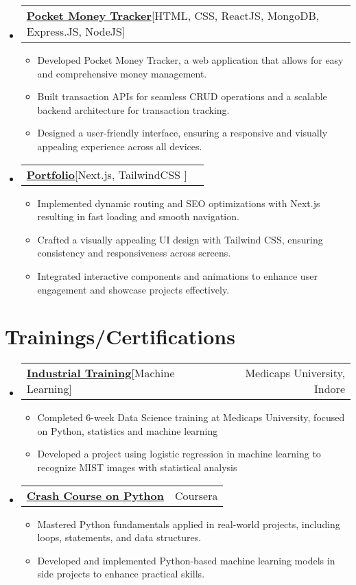 \documentclass[letterpaper,10pt]{article}
\makeatletter
\newcommand{\resumeItem}[1]{
    \item\small{
      {#1 \vspace{-2pt}}
    }
  }
\newcommand{\resumeCertheading}[2]{
    \vspace{5pt}\item
      \begin{tabular*}{0.97\textwidth}[t]{l@{\extracolsep{\fill}}r}
        {#1} & #2 \\
      \end{tabular*}\vspace{-7pt}
  }
\newcommand{\resumeSubSubheading}[2]{
      \item
      \begin{tabular*}{0.97\textwidth}{l@{\extracolsep{\fill}}r}
        \textit{\small#1} & \textit{\small #2} \\
      \end{tabular*}\vspace{-7pt}
  }
\newcommand{\resumeProjectHeading}[2]{
      \item
      \begin{tabular*}{0.97\textwidth}{l@{\extracolsep{\fill}}r}
        \small#1 & #2 \\
      \end{tabular*}\vspace{-7pt}
  }
\newcommand{\resumeSubHeadingListStart}{\begin{itemize}[leftmargin=0.15in, label={}]}
\newcommand{\resumeSubHeadingListEnd}{\end{itemize}}
\newcommand{\resumeItemListStart}{\begin{itemize}}
\newcommand{\resumeItemListEnd}{\end{itemize}\vspace{-5pt}}
\makeatother
\begin{document}
\resumeSubHeadingListStart
\resumeProjectHeading
{\textbf{\href{https://github.com/shanutiwari1010/money-tracker-app}{Pocket Money Tracker}\hspace{5pt}}{[HTML, CSS, ReactJS, MongoDB, Express.JS, NodeJS]}}{}
\resumeItemListStart
\resumeItem{Developed Pocket Money Tracker, a web application that allows for easy and comprehensive money management.}
\resumeItem{Built transaction APIs for seamless CRUD operations and a scalable backend architecture for transaction tracking.}
\resumeItem{Designed a user-friendly interface, ensuring a responsive and visually appealing experience across all devices.}
\resumeItemListEnd
\resumeSubHeadingListEnd


\resumeSubHeadingListStart
\resumeProjectHeading
{\textbf{\href{https://github.com/shanutiwari1010/portfolio}{Portfolio}\hspace{5pt}}{{[Next.js, TailwindCSS ]}}}{}
\resumeItemListStart
\resumeItem{Implemented dynamic routing and SEO optimizations with Next.js resulting in fast loading and smooth navigation.}
\resumeItem{Crafted a visually appealing UI design with Tailwind CSS, ensuring consistency and responsiveness across screens.}
\resumeItem{Integrated interactive components and animations to enhance user engagement and showcase projects effectively.}
\resumeItemListEnd
\resumeSubHeadingListEnd


\section{Trainings/Certifications}
\resumeSubHeadingListStart

\resumeCertheading
{\textbf{\href{https://medicaps.ac.in/}{Industrial Training}\hspace{5pt}}{{[Machine Learning]}}}{Medicaps University, Indore}
\resumeItemListStart
\resumeItem{Completed 6-week Data Science training at Medicaps University, focused on Python, statistics and machine learning}
\resumeItem{Developed a project using logistic regression in machine learning to recognize MIST images with statistical analysis}
\resumeItemListEnd

\resumeCertheading
{\textbf{\href{https://coursera.org/verify/FHDUZAK7YL3Q}{Crash Course on Python}\hspace{3pt}}{{}}}{Coursera}
\resumeItemListStart
\resumeItem{Mastered Python fundamentals applied in real-world projects, including loops, statements, and data structures.}
\resumeItem{Developed and implemented Python-based machine learning models in side projects to enhance practical skills.}
\resumeItemListEnd
\resumeSubHeadingListEnd
\end{document}
